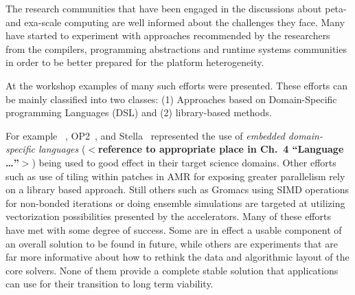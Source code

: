 The research communities that have been engaged in the discussions
about peta- and exa-scale computing are well informed about the
challenges they face.
\textcolor{fhcolor}{Many have started to experiment with approaches
recommended by the researchers from the compilers, programming
abstractions and runtime systems communities in order to be better
prepared for the platform heterogeneity.}

At the workshop examples of many such efforts were presented.
\textcolor{fhcolor}{These efforts can be mainly classified into two
classes: (1) Approaches based on Domain-Specific programming Languages
(DSL) and (2) library-based methods.}

\textcolor{fhcolor}{For example \hipacc~\cite{MHTKE12a}, OP2~\cite{}, and Stella~\cite{} represented the use of
\emph{embedded domain-specific languages} (\textbf{$<$reference to appropriate place in Ch.~4 ``Language \ldots''$>$}) being used to good effect in their target science
domains.}
Other efforts such as use of tiling within patches in AMR for
exposing greater parallelism rely on a library based approach. Still
others such as Gromacs using SIMD operations for non-bonded iterations
or doing ensemble simulations are targeted at utilizing vectorization
possibilities presented by the accelerators. Many of these efforts
have met with some degree of success. Some are in effect a usable
component of an overall solution to be found in future, while others
are experiments that are far more informative about how to rethink the
data and algorithmic layout of the core solvers. None of them provide
a complete stable solution that applications can use for their
transition to long term viability. 



